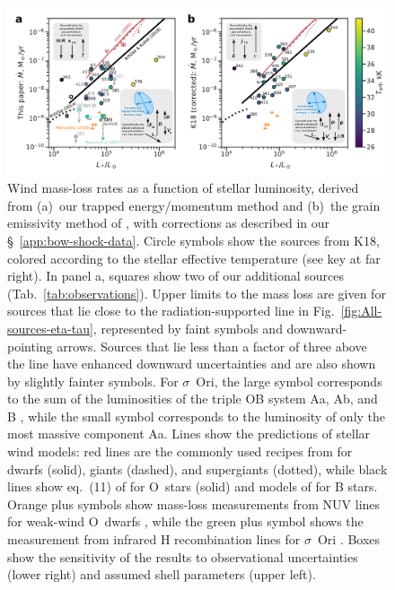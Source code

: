\begin{figure}
  \centering
  \includegraphics[width=\linewidth]{figs/Mdot-vs-lum-combo-edited}
  \caption{Wind mass-loss rates as a function of stellar luminosity,
    derived from (a)~our trapped energy/momentum method and (b)~the
    grain emissivity method of \citet{Kobulnicky:2018a}, with
    corrections as described in our \S~\ref{app:bow-shock-data}.
    Circle symbols show the sources from K18, colored according to the
    stellar effective temperature (see key at far right). In panel a,
    squares show two of our additional sources
    (Tab.~\ref{tab:observations}). Upper limits to the mass loss are
    given for sources that lie close to the radiation-supported line
    in Fig.~\ref{fig:All-sources-eta-tau}, represented by faint
    symbols and downward-pointing arrows.  Sources that lie less than
    a factor of three above the line have enhanced downward
    uncertainties and are also shown by slightly fainter symbols.  For
    \(\sigma\)~Ori, the large symbol corresponds to the sum of the
    luminosities of the triple OB system Aa, Ab, and B
    \citep{Simon-Diaz:2015a}, while the small symbol corresponds to
    the luminosity of only the most massive component Aa.  Lines show
    the predictions of stellar wind models: red lines are the commonly
    used recipes from \citet{Vink:2000a} for dwarfs (solid), giants
    (dashed), and supergiants (dotted), while black lines show
    eq.~(11) of \citet{Krticka:2017a} for O~stars (solid) and models
    of \citet{Krticka:2014a} for B stars.  Orange plus symbols show
    mass-loss measurements from NUV lines for weak-wind O~dwarfs
    \citep{Marcolino:2009a}, while the green plus symbol shows the
    measurement from infrared H recombination lines for \(\sigma\)~Ori
    \citep{Najarro:2011a}.  Boxes show the sensitivity of the results
    to observational uncertainties (lower right) and assumed shell
    parameters (upper left).}
  \label{fig:mass-loss-vs-luminosity}
\end{figure}


